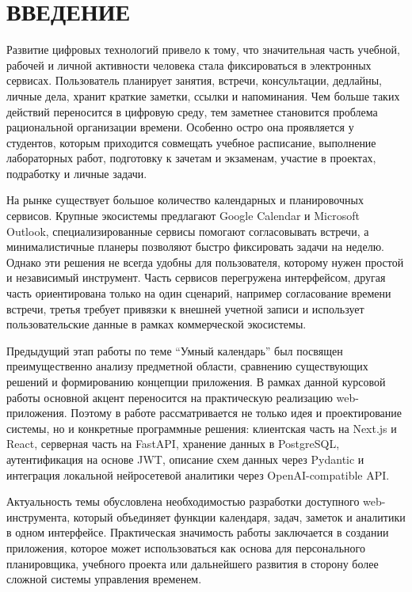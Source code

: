 \documentclass[14pt,a4paper]{extreport}
\begin{document}
\chapter*{ВВЕДЕНИЕ}

Развитие цифровых технологий привело к тому, что значительная часть учебной, рабочей и личной активности человека стала фиксироваться в электронных сервисах. Пользователь планирует занятия, встречи, консультации, дедлайны, личные дела, хранит краткие заметки, ссылки и напоминания. Чем больше таких действий переносится в цифровую среду, тем заметнее становится проблема рациональной организации времени. Особенно остро она проявляется у студентов, которым приходится совмещать учебное расписание, выполнение лабораторных работ, подготовку к зачетам и экзаменам, участие в проектах, подработку и личные задачи.

На рынке существует большое количество календарных и планировочных сервисов. Крупные экосистемы предлагают Google Calendar и Microsoft Outlook, специализированные сервисы помогают согласовывать встречи, а минималистичные планеры позволяют быстро фиксировать задачи на неделю. Однако эти решения не всегда удобны для пользователя, которому нужен простой и независимый инструмент. Часть сервисов перегружена интерфейсом, другая часть ориентирована только на один сценарий, например согласование времени встречи, третья требует привязки к внешней учетной записи и использует пользовательские данные в рамках коммерческой экосистемы.

Предыдущий этап работы по теме ``Умный календарь'' был посвящен преимущественно анализу предметной области, сравнению существующих решений и формированию концепции приложения. В рамках данной курсовой работы основной акцент переносится на практическую реализацию web-приложения. Поэтому в работе рассматривается не только идея и проектирование системы, но и конкретные программные решения: клиентская часть на Next.js и React, серверная часть на FastAPI, хранение данных в PostgreSQL, аутентификация на основе JWT, описание схем данных через Pydantic и интеграция локальной нейросетевой аналитики через OpenAI-compatible API.

Актуальность темы обусловлена необходимостью разработки доступного web-инструмента, который объединяет функции календаря, задач, заметок и аналитики в одном интерфейсе. Практическая значимость работы заключается в создании приложения, которое может использоваться как основа для персонального планировщика, учебного проекта или дальнейшего развития в сторону более сложной системы управления временем.
\end{document}
